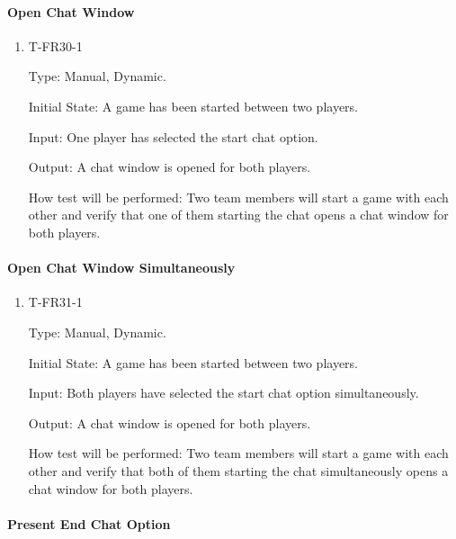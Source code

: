 \documentclass[12pt, titlepage]{article}
\begin{document}
    \paragraph{Open Chat Window}

        \begin{enumerate}

        \item{T-FR30-1\\}

            Type: Manual, Dynamic.
            					
            Initial State: A game has been started between two players.
            					
            Input: One player has selected the start chat option.
            					
            Output: A chat window is opened for both players.

            How test will be performed: Two team members will start a game with each other and verify that one of them starting the chat opens a chat window for both players.

        \end{enumerate}
        
    \paragraph{Open Chat Window Simultaneously}

        \begin{enumerate}

        \item{T-FR31-1\\}

            Type: Manual, Dynamic.
            					
            Initial State: A game has been started between two players.
            					
            Input: Both players have selected the start chat option simultaneously.
            					
            Output: A chat window is opened for both players.

            How test will be performed: Two team members will start a game with each other and verify that both of them starting the chat simultaneously opens a chat window for both players.

        \end{enumerate}
    
    \paragraph{Present End Chat Option}
\end{document}
